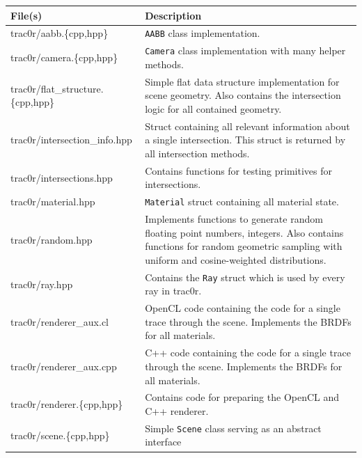\documentclass[
  twoside,
  11pt, a4paper,
  footinclude=true,
  headinclude=true,
  cleardoublepage=empty
]{scrreprt}
\begin{document}
\begin{table}[H]
    \centering
    \begin{tabularx}{\textwidth}{l | X}
        File(s)                    & Description \\ \hline
        trac0r/aabb.\{cpp,hpp\}      & \texttt{AABB} class implementation. \\
        trac0r/camera.\{cpp,hpp\}    & \texttt{Camera} class implementation with many helper methods. \\
        trac0r/flat\_structure.\{cpp,hpp\}  & Simple flat data structure implementation for scene geometry.
                                     Also contains the intersection logic for all contained
                                     geometry.\\
        trac0r/intersection\_info.hpp & Struct containing all relevant information about a single
                                     intersection. This struct is returned by all intersection
                                     methods. \\
        trac0r/intersections.hpp   & Contains functions for testing primitives for intersections. \\
        trac0r/material.hpp        & \texttt{Material} struct containing all material state. \\
        trac0r/random.hpp          & Implements functions to generate random floating point
                                     numbers, integers. Also contains functions for random
                                     geometric sampling with uniform and cosine-weighted
                                     distributions. \\
        trac0r/ray.hpp             & Contains the \texttt{Ray} struct which is used by every ray in
                                     trac0r.\\
        trac0r/renderer\_aux.cl    & OpenCL code containing the code for a single trace through the
                                     scene. Implements the BRDFs for all materials. \\
        trac0r/renderer\_aux.cpp   & C++ code containing the code for a single trace through the
                                     scene. Implements the BRDFs for all materials. \\
        trac0r/renderer.\{cpp,hpp\}  & Contains code for preparing the
                                     OpenCL and C++ renderer. \\
        trac0r/scene.\{cpp,hpp\}     & Simple \texttt{Scene} class serving as an abstract interface

\end{tabularx}
\end{table}
\end{document}
